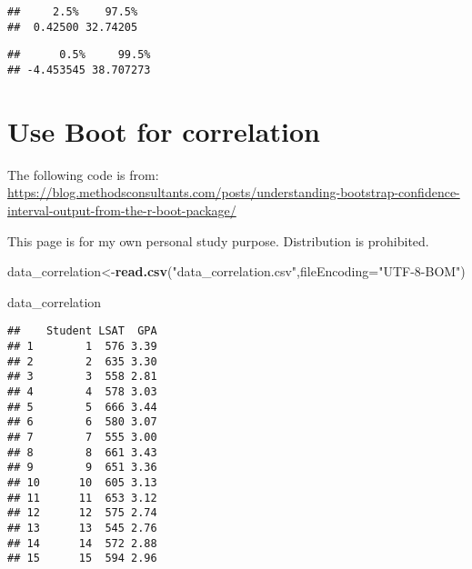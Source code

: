 \documentclass[]{book}
\newenvironment{Shaded}{\begin{snugshade}}{\end{snugshade}}
\newcommand{\CommentTok}[1]{\textcolor[rgb]{0.56,0.35,0.01}{\textit{#1}}}
\newcommand{\DataTypeTok}[1]{\textcolor[rgb]{0.13,0.29,0.53}{#1}}
\newcommand{\FloatTok}[1]{\textcolor[rgb]{0.00,0.00,0.81}{#1}}
\newcommand{\KeywordTok}[1]{\textcolor[rgb]{0.13,0.29,0.53}{\textbf{#1}}}
\newcommand{\NormalTok}[1]{#1}
\newcommand{\OperatorTok}[1]{\textcolor[rgb]{0.81,0.36,0.00}{\textbf{#1}}}
\newcommand{\StringTok}[1]{\textcolor[rgb]{0.31,0.60,0.02}{#1}}
\begin{document}
\begin{verbatim}
##     2.5%    97.5% 
##  0.42500 32.74205
\end{verbatim}

\begin{Shaded}
\end{Shaded}

\begin{verbatim}
##      0.5%     99.5% 
## -4.453545 38.707273
\end{verbatim}

\hypertarget{use-boot-for-correlation}{%
\section{Use Boot for correlation}\label{use-boot-for-correlation}}

The following code is from: \url{https://blog.methodsconsultants.com/posts/understanding-bootstrap-confidence-interval-output-from-the-r-boot-package/}

This page is for my own personal study purpose. Distribution is prohibited.

\begin{Shaded}
\begin{Highlighting}[]
\NormalTok{data_correlation<-}\KeywordTok{read.csv}\NormalTok{(}\StringTok{"data_correlation.csv"}\NormalTok{,}\DataTypeTok{fileEncoding=}\StringTok{"UTF-8-BOM"}\NormalTok{)}

\NormalTok{data_correlation}
\end{Highlighting}
\end{Shaded}

\begin{verbatim}
##    Student LSAT  GPA
## 1        1  576 3.39
## 2        2  635 3.30
## 3        3  558 2.81
## 4        4  578 3.03
## 5        5  666 3.44
## 6        6  580 3.07
## 7        7  555 3.00
## 8        8  661 3.43
## 9        9  651 3.36
## 10      10  605 3.13
## 11      11  653 3.12
## 12      12  575 2.74
## 13      13  545 2.76
## 14      14  572 2.88
## 15      15  594 2.96
\end{verbatim}

\begin{Shaded}
\end{Shaded}
\end{document}
